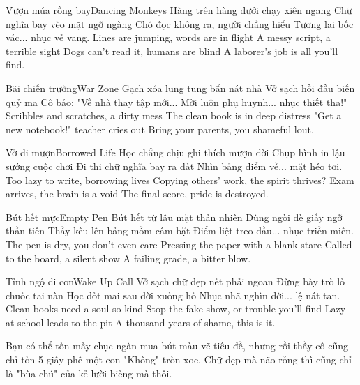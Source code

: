 \begin{tutuyetbox}{Vượn múa rồng bay}{Dancing Monkeys}
Hàng trên hàng dưới chạy xiên ngang
Chữ nghĩa bay vèo mặt ngỡ ngàng
Chó đọc không ra, người chẳng hiểu
Tương lai bốc vác... nhục vẻ vang.
\tcblower
Lines are jumping, words are in flight
A messy script, a terrible sight
Dogs can't read it, humans are blind
A laborer's job is all you'll find.
\end{tutuyetbox}

\begin{tutuyetbox}{Bãi chiến trường}{War Zone}
Gạch xóa lung tung bẩn nát nhà
Vở sạch hồi đầu biến quỷ ma
Cô bảo: "Về nhà thay tập mới...
Mời luôn phụ huynh... nhục thiết tha!"
\tcblower
Scribbles and scratches, a dirty mess
The clean book is in deep distress
"Get a new notebook!" teacher cries out
Bring your parents, you shameful lout.
\end{tutuyetbox}

\begin{tutuyetbox}{Vở đi mượn}{Borrowed Life}
Học chẳng chịu ghi thích mượn đời
Chụp hình in lậu sướng cuộc chơi
Đi thi chữ nghĩa bay ra đất
Nhìn bảng điểm về... mặt héo tơi.
\tcblower
Too lazy to write, borrowing lives
Copying others' work, the spirit thrives?
Exam arrives, the brain is a void
The final score, pride is destroyed.
\end{tutuyetbox}

\begin{tutuyetbox}{Bút hết mực}{Empty Pen}
Bút hết từ lâu mặt thản nhiên
Dùng ngòi đè giấy ngỡ thần tiên
Thầy kêu lên bảng mồm câm bặt
Điểm liệt treo đầu... nhục triền miên.
\tcblower
The pen is dry, you don't even care
Pressing the paper with a blank stare
Called to the board, a silent show
A failing grade, a bitter blow.
\end{tutuyetbox}

\begin{tutuyetbox}{Tỉnh ngộ đi con}{Wake Up Call}
Vở sạch chữ đẹp nết phải ngoan
Đừng bày trò lố chuốc tai nàn
Học dốt mai sau đời xuống hố
Nhục nhã nghìn đời... lệ nát tan.
\tcblower
Clean books need a soul so kind
Stop the fake show, or trouble you'll find
Lazy at school leads to the pit
A thousand years of shame, this is it.
\end{tutuyetbox}

\begin{ghichu}
Bạn có thể tốn mấy chục ngàn mua bút màu vẽ tiêu đề, nhưng rồi thầy cô cũng chỉ tốn 5 giây phê một con "Không" tròn xoe. Chữ đẹp mà não rỗng thì cũng chỉ là "bùa chú" của kẻ lười biếng mà thôi.
\end{ghichu}